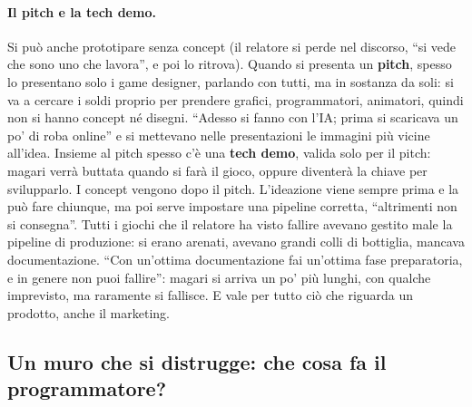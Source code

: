 \paragraph{Il pitch e la tech demo.} Si può anche prototipare senza concept
(il relatore si perde nel discorso, ``si vede che sono uno che lavora'', e poi
lo ritrova). Quando si presenta un \textbf{pitch}, spesso lo presentano solo i
game designer, parlando con tutti, ma in sostanza da soli: si va a cercare i
soldi proprio per prendere grafici, programmatori, animatori, quindi non si hanno
concept né disegni. ``Adesso si fanno con l'IA; prima si scaricava un po' di roba
online'' e si mettevano nelle presentazioni le immagini più vicine all'idea.
Insieme al pitch spesso c'è una \textbf{tech demo}, valida solo per il pitch:
magari verrà buttata quando si farà il gioco, oppure diventerà la chiave per
svilupparlo. I concept vengono dopo il pitch. L'ideazione viene sempre prima e la
può fare chiunque, ma poi serve impostare una pipeline corretta, ``altrimenti
non si consegna''. Tutti i giochi che il relatore ha visto fallire avevano gestito
male la pipeline di produzione: si erano arenati, avevano grandi colli di
bottiglia, mancava documentazione. ``Con un'ottima documentazione fai un'ottima
fase preparatoria, e in genere non puoi fallire'': magari si arriva un po' più
lunghi, con qualche imprevisto, ma raramente si fallisce. E vale per tutto ciò
che riguarda un prodotto, anche il marketing.

\subsection{Un muro che si distrugge: che cosa fa il programmatore?}

